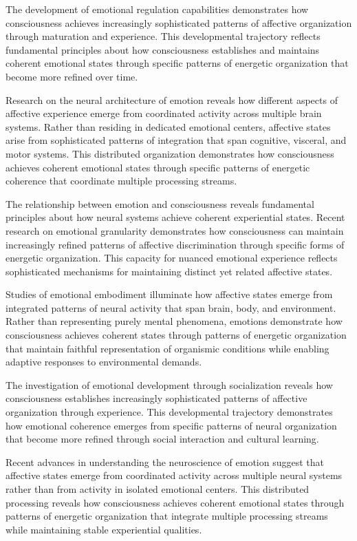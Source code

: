 The development of emotional regulation capabilities \cite{Siegel2012} demonstrates how consciousness achieves increasingly sophisticated patterns of affective organization through maturation and experience. This developmental trajectory reflects fundamental principles about how consciousness establishes and maintains coherent emotional states through specific patterns of energetic organization that become more refined over time.

Research on the neural architecture of emotion \cite{Davidson2012} reveals how different aspects of affective experience emerge from coordinated activity across multiple brain systems. Rather than residing in dedicated emotional centers, affective states arise from sophisticated patterns of integration that span cognitive, visceral, and motor systems. This distributed organization demonstrates how consciousness achieves coherent emotional states through specific patterns of energetic coherence that coordinate multiple processing streams.

The relationship between emotion and consciousness reveals fundamental principles about how neural systems achieve coherent experiential states. Recent research on emotional granularity \cite{Barrett2017} demonstrates how consciousness can maintain increasingly refined patterns of affective discrimination through specific forms of energetic organization. This capacity for nuanced emotional experience reflects sophisticated mechanisms for maintaining distinct yet related affective states.

Studies of emotional embodiment \cite{Fuchs2019} illuminate how affective states emerge from integrated patterns of neural activity that span brain, body, and environment. Rather than representing purely mental phenomena, emotions demonstrate how consciousness achieves coherent states through patterns of energetic organization that maintain faithful representation of organismic conditions while enabling adaptive responses to environmental demands.

The investigation of emotional development through socialization \cite{Thompson2007} reveals how consciousness establishes increasingly sophisticated patterns of affective organization through experience. This developmental trajectory demonstrates how emotional coherence emerges from specific patterns of neural organization that become more refined through social interaction and cultural learning.

Recent advances in understanding the neuroscience of emotion \cite{Fox2019} suggest that affective states emerge from coordinated activity across multiple neural systems rather than from activity in isolated emotional centers. This distributed processing reveals how consciousness achieves coherent emotional states through patterns of energetic organization that integrate multiple processing streams while maintaining stable experiential qualities.

